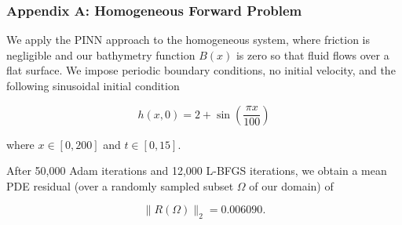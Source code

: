 \begin{frame}
    \frametitle{Appendix A: Homogeneous Forward Problem}

    We apply the PINN approach to the homogeneous system, where friction is negligible and our bathymetry function 
    $B(x)$ is zero so that fluid flows over a flat surface.  We impose periodic boundary conditions, no initial 
    velocity, and the following sinusoidal initial condition

    $$
    h(x, 0) = 2 + \sin{\left( \frac{\pi x}{100} \right)}
    $$

    where $x \in [0, 200]$ and $t \in [0, 15]$.

    \medskip
    \pause

    After 50,000 Adam iterations and 12,000 L-BFGS iterations, we obtain a mean PDE residual (over a randomly sampled 
    subset $\Omega$ of our domain) of 
    
    $$
    \lVert R(\Omega) \rVert_2 = 0.006090.
    $$
\end{frame}